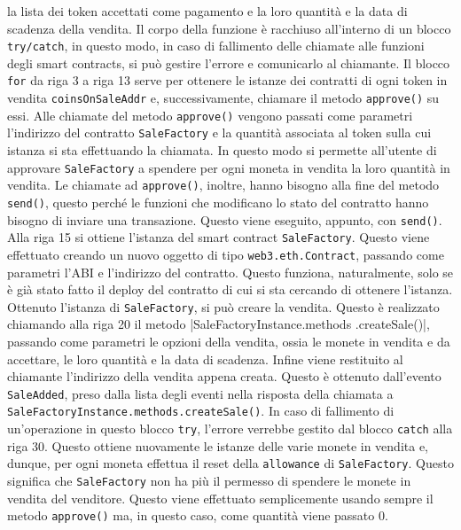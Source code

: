 \documentclass[a4paper]{article}
\begin{document}
        la lista dei token accettati come pagamento e la loro quantità e la data di scadenza della vendita.
        \newline
        Il corpo della funzione è racchiuso all'interno di un blocco \verb|try/catch|, in questo modo, in caso di fallimento delle chiamate alle funzioni degli smart contracts, si può gestire l'errore e comunicarlo al chiamante.
        \newline
        Il blocco \verb|for| da riga 3 a riga 13 serve per ottenere le istanze dei contratti di ogni token in vendita \verb|coinsOnSaleAddr| e, successivamente, chiamare il metodo \verb|approve()| su essi.
        Alle chiamate del metodo \verb|approve()| vengono passati come parametri l'indirizzo del contratto \verb|SaleFactory| e la quantità associata al token sulla cui istanza si sta effettuando la chiamata.
        In questo modo si permette all'utente di approvare \verb|SaleFactory| a spendere per ogni moneta in vendita la loro quantità in vendita.
        \newline
        Le chiamate ad \verb|approve()|, inoltre, hanno bisogno alla fine del metodo \verb|send()|,
        questo perché le funzioni che modificano lo stato del contratto hanno bisogno di inviare una transazione. Questo viene eseguito, appunto, con \verb|send()|\cite{soliditysend}.
        \newline
        Alla riga 15 si ottiene l'istanza del smart contract \verb|SaleFactory|. Questo viene effettuato creando un nuovo oggetto di tipo \verb|web3.eth.Contract|, passando come parametri l'ABI e l'indirizzo del contratto.
        Questo funziona, naturalmente, solo se è già stato fatto il deploy del contratto di cui si sta cercando di ottenere l'istanza.
        \newline
        Ottenuto l'istanza di \verb|SaleFactory|, si può creare la vendita. Questo è realizzato chiamando alla riga 20 il metodo \spverb|SaleFactoryInstance.methods .createSale()|, passando come parametri le opzioni della vendita,
        ossia le monete in vendita e da accettare, le loro quantità e la data di scadenza.
        \newline
        Infine viene restituito al chiamante l'indirizzo della vendita appena creata. Questo è ottenuto dall'evento \verb|SaleAdded|, preso dalla lista degli eventi nella risposta della chiamata a \verb|SaleFactoryInstance.methods.createSale()|.
        \newline
        In caso di fallimento di un'operazione in questo blocco \verb|try|, l'errore verrebbe gestito dal blocco \verb|catch| alla riga 30. Questo ottiene nuovamente le istanze delle varie monete in vendita e, dunque, per ogni moneta effettua il reset della
        \verb|allowance| di \verb|SaleFactory|. Questo significa che \verb|SaleFactory| non ha più il permesso di spendere le monete in vendita del venditore. Questo viene effettuato semplicemente usando sempre il metodo \verb|approve()| ma, in questo caso,
        come quantità viene passato 0.
\end{document}
